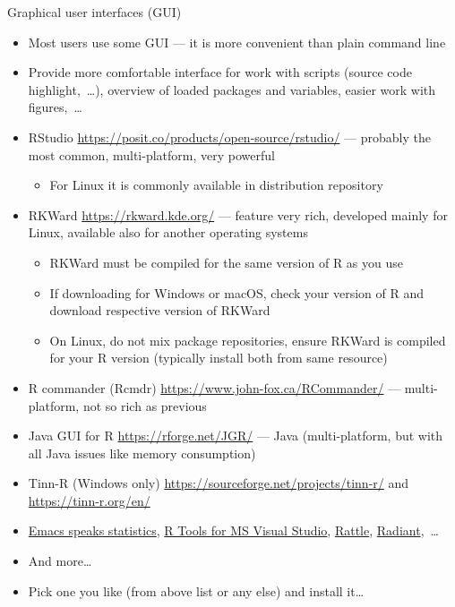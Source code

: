 \documentclass[compress, xelatex, 11pt, xcolor=svgnames, aspectratio=169, url={hyphens, lowtilde}]{beamer}
\begin{document}
\begin{frame}[allowframebreaks]{Graphical user interfaces (GUI)}
	\label{gui}
	\begin{itemize}
		\item Most users use some GUI --- it is more convenient than plain command line
		\item Provide more comfortable interface for work with scripts (source code highlight,~\ldots), overview of loaded packages and variables, easier work with figures,~\ldots
		\item RStudio \url{https://posit.co/products/open-source/rstudio/} --- probably the most common, multi-platform, very powerful
		\begin{itemize}
			\item For Linux it is commonly available in distribution repository
		\end{itemize}
		\item RKWard \url{https://rkward.kde.org/} --- feature very rich, developed mainly for Linux, available also for another operating systems
		\begin{itemize}
			\item RKWard must be compiled for the same version of R as you use
			\item If downloading for Windows or macOS, check your version of R and download respective version of RKWard
			\item On Linux, do not mix package repositories, ensure RKWard is compiled for your R version (typically install both from same resource)
		\end{itemize}
		\item R commander (Rcmdr) \url{https://www.john-fox.ca/RCommander/} --- multi-platform, not so rich as previous
		\item Java GUI for R \url{https://rforge.net/JGR/} --- Java (multi-platform, but with all Java issues like memory consumption)
		\item Tinn-R (Windows only) \url{https://sourceforge.net/projects/tinn-r/} and \url{https://tinn-r.org/en/}
		\item \href{https://ess.r-project.org/}{Emacs speaks statistics}, \href{https://code.visualstudio.com/docs/languages/r}{R Tools for MS Visual Studio}, \href{https://rattle.togaware.com/}{Rattle}, \href{https://radiant-rstats.github.io/docs/}{Radiant},~\ldots
		\item And more\ldots
		\item Pick one you like (from above list or any else) and install it\ldots
	\end{itemize}
\end{frame}
\end{document}
